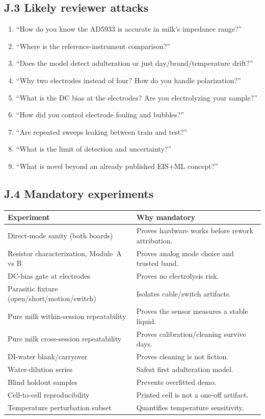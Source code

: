 \documentclass[11pt,a4paper]{article}
\begin{document}
\subsection{J.3 Likely reviewer attacks}

\begin{reviewerbox}
\begin{enumerate}
\item ``How do you know the AD5933 is accurate in milk's impedance range?''
\item ``Where is the reference-instrument comparison?''
\item ``Does the model detect adulteration or just day/brand/temperature drift?''
\item ``Why two electrodes instead of four? How do you handle polarization?''
\item ``What is the DC bias at the electrodes? Are you electrolyzing your sample?''
\item ``How did you control electrode fouling and bubbles?''
\item ``Are repeated sweeps leaking between train and test?''
\item ``What is the limit of detection and uncertainty?''
\item ``What is novel beyond an already published EIS+ML concept?''
\end{enumerate}
\end{reviewerbox}

\subsection{J.4 Mandatory experiments}

\begin{xltabular}{\textwidth}{L{42mm}Y}
\toprule
\textbf{Experiment} & \textbf{Why mandatory}\\
\midrule
Direct-mode sanity (both boards) & Proves hardware works before rework attribution.\\
Resistor characterization, Module~A vs B & Proves analog mode choice and trusted band.\\
DC-bias gate at electrodes & Proves no electrolysis risk.\\
Parasitic fixture (open/short/motion/switch) & Isolates cable/switch artifacts.\\
Pure milk within-session repeatability & Proves the sensor measures a stable liquid.\\
Pure milk cross-session repeatability & Proves calibration/cleaning survive days.\\
DI-water blank/carryover & Proves cleaning is not fiction.\\
Water-dilution series & Safest first adulteration model.\\
Blind holdout samples & Prevents overfitted demo.\\
Cell-to-cell reproducibility & Printed cell is not a one-off artifact.\\
Temperature perturbation subset & Quantifies temperature sensitivity.\\
\bottomrule
\end{xltabular}
\end{document}
